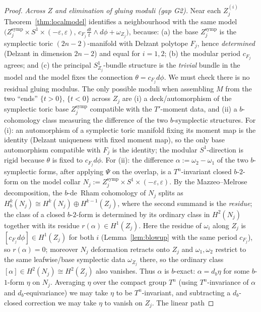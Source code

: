 \documentclass{amsart}
\theoremstyle{definition}
\begin{document}
\begin{proof}
\emph{Across $Z$ and elimination of gluing moduli (gap G2).} Near each
$Z_j^{(i)}$ Theorem~\ref{thm:localmodel} identifies a neighbourhood with the
same model $\bigl(Z_j^{\mathrm{symp}}\times S^1\times(-\varepsilon,\varepsilon),
\,c_{F_j}\tfrac{dt}{t}\wedge d\phi+\omega_{Z_j}\bigr)$, because: (a) the base
$Z_j^{\mathrm{symp}}$ is the symplectic toric $(2n-2)$-manifold with Delzant
polytope $F_j$, hence \emph{determined} (Delzant in dimension $2n-2$) and equal
for $i=1,2$; (b) the modular period $c_{F_j}$ agrees; and (c) the principal
$S^1_{Z_j}$-bundle structure is the \emph{trivial} bundle in the model and the
model fixes the connection $\theta=c_{F_j}d\phi$. We must check there is no
residual gluing modulus. The only possible moduli when assembling $M$ from the
two ``ends'' $\{t>0\}$, $\{t<0\}$ across $Z_j$ are (i) a deck/automorphism of
the symplectic toric base $Z_j^{\mathrm{symp}}$ compatible with the
$T'$-moment data, and (ii) a $b$-cohomology class measuring the difference of
the two $b$-symplectic structures. For (i): an automorphism of a symplectic
toric manifold fixing its moment map is the identity (Delzant uniqueness with
fixed moment map), so the only base automorphism compatible with $F_j$ is the
identity; the modular $S^1$-direction is rigid because $\theta$ is fixed to
$c_{F_j}d\phi$. For (ii): the difference $\alpha:=\omega_2-\omega_1$ of the two
$b$-symplectic forms, after applying $\Psi$ on the overlap, is a $T^n$-invariant
closed $b$-$2$-form on the model collar
$N_j:=Z_j^{\mathrm{symp}}\times S^1\times(-\varepsilon,\varepsilon)$. By the
Mazzeo--Melrose decomposition, the $b$-de~Rham cohomology of $N_j$ splits as
$H^k_b(N_j)\cong H^k(N_j)\oplus H^{k-1}(Z_j)$, where the second summand is the
\emph{residue}; the class of a closed $b$-$2$-form is determined by its ordinary
class in $H^2(N_j)$ together with its residue $r(\alpha)\in H^1(Z_j)$. Here the
residue of $\omega_i$ along $Z_j$ is $[c_{F_j}d\phi]\in H^1(Z_j)$ for both $i$
(Lemma~\ref{lem:blowup} with the same period $c_{F_j}$), so $r(\alpha)=0$;
moreover $N_j$ deformation retracts onto $Z_j$ and $\omega_1,\omega_2$ restrict
to the same leafwise/base symplectic data $\omega_{Z_j}$ there, so the ordinary
class $[\alpha]\in H^2(N_j)\cong H^2(Z_j)$ also vanishes. Thus $\alpha$ is
$b$-exact: $\alpha=d_b\eta$ for some $b$-$1$-form $\eta$ on $N_j$. Averaging
$\eta$ over the compact group $T^n$ (using $T^n$-invariance of $\alpha$ and
$d_b$-equivariance) we may take $\eta$ to be $T^n$-invariant, and subtracting a
$d_b$-closed correction we may take $\eta$ to vanish on $Z_j$. The linear path

\end{proof}
\end{document}
